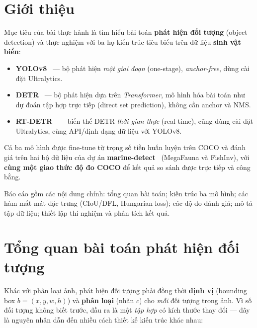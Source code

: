 \documentclass[12pt]{article}
\numberwithin{equation}{section}
\begin{document}
\fontsize{12pt}{15pt}\selectfont
\setlength{\parskip}{4pt}

\hypersetup{pageanchor=false}

\hypersetup{pageanchor=true}

\tableofcontents
\newpage

\section{Giới thiệu}

Mục tiêu của bài thực hành là tìm hiểu bài toán \textbf{phát hiện đối tượng} (object
detection) và thực nghiệm với ba họ kiến trúc tiêu biểu trên dữ liệu \textbf{sinh vật biển}:
\begin{itemize}
  \item \textbf{YOLOv8}~\cite{yolov8} --- bộ phát hiện \textit{một giai đoạn} (one-stage),
  \textit{anchor-free}, dùng cài đặt Ultralytics.
  \item \textbf{DETR}~\cite{detr} --- bộ phát hiện dựa trên \textit{Transformer}, mô hình hóa
  bài toán như dự đoán tập hợp trực tiếp (direct set prediction), không cần anchor và NMS.
  \item \textbf{RT-DETR}~\cite{rtdetr} --- biến thể DETR \textit{thời gian thực} (real-time),
  cũng dùng cài đặt Ultralytics, cùng API/định dạng dữ liệu với YOLOv8.
\end{itemize}

Cả ba mô hình được fine-tune từ trọng số tiền huấn luyện trên COCO và đánh giá trên hai bộ
dữ liệu của dự án \textbf{marine-detect}~\cite{marinedetect} (MegaFauna và FishInv), với
\textbf{cùng một giao thức độ đo COCO} để kết quả so sánh được trực tiếp và công bằng.

Báo cáo gồm các nội dung chính: tổng quan bài toán; kiến trúc ba mô hình; các hàm mất mát
đặc trưng (CIoU/DFL, Hungarian loss); các độ đo đánh giá; mô tả tập dữ liệu; thiết lập thí
nghiệm và phân tích kết quả.

\section{Tổng quan bài toán phát hiện đối tượng}

Khác với phân loại ảnh, phát hiện đối tượng phải đồng thời \textbf{định vị} (bounding box
$b=(x,y,w,h)$) và \textbf{phân loại} (nhãn $c$) cho \textit{mỗi} đối tượng trong ảnh. Vì số
đối tượng không biết trước, đầu ra là một \textit{tập hợp} có kích thước thay đổi --- đây là
nguyên nhân dẫn đến nhiều cách thiết kế kiến trúc khác nhau:
\end{document}
